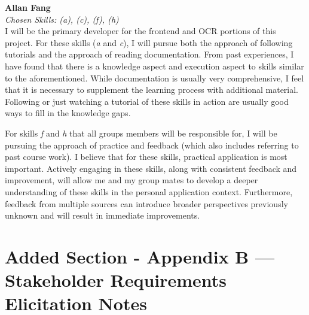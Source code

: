 \documentclass[12pt]{article}
\begin{document}
\begin{enumerate}
  \medskip
  \textbf{Allan Fang}\\
  \textit{Chosen Skills: (a), (c), (f), (h)} \\
  I will be the primary developer for the frontend and OCR portions of this project. For these skills (\textit{a} and \textit{c}), I will pursue both the approach of following tutorials and the approach of reading documentation. From past experiences, I have found that there is a knowledge aspect and execution aspect to skills similar to the aforementioned. While documentation is usually very comprehensive, I feel that it is necessary to supplement the learning process with additional material. Following or just watching a tutorial of these skills in action are usually good ways to fill in the knowledge gaps. \par
  For skills \textit{f} and \textit{h} that all groups members will be responsible for, I will be pursuing the approach of practice and feedback (which also includes referring to past course work). I believe that for these skills, practical application is most important. Actively engaging in these skills, along with consistent feedback and improvement, will allow me and my group mates to develop a deeper understanding of these skills in the personal application context. Furthermore, feedback from multiple sources can introduce broader perspectives previously unknown and will result in immediate improvements.

\end{enumerate}

\section*{Added Section - Appendix B --- Stakeholder Requirements Elicitation Notes}
\end{document}
